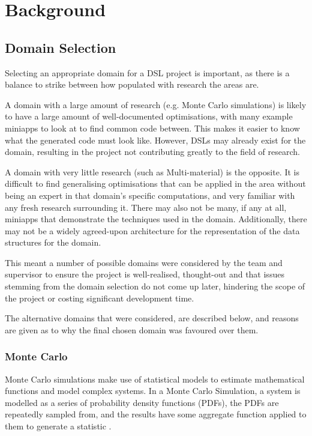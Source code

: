 \chapter{Background}

\section{Domain Selection}
Selecting an appropriate domain for a DSL project is important, as there is a balance to strike between how populated with research the areas are.

A domain with a large amount of research (e.g. Monte Carlo simulations) is likely to have a large amount of well-documented optimisations, with many example miniapps to look at to find common code between. This makes it easier to know what the generated code must look like. However, DSLs may already exist for the domain, resulting in the project not contributing greatly to the field of research.

A domain with very little research (such as Multi-material) is the opposite. It is difficult to find generalising optimisations that can be applied in the area without being an expert in that domain's specific computations, and very familiar with any fresh research surrounding it. There may also not be many, if any at all, miniapps that demonstrate the techniques used in the domain. Additionally, there may not be a widely agreed-upon architecture for the representation of the data structures for the domain.

This meant a number of possible domains were considered by the team and supervisor to ensure the project is well-realised, thought-out and that issues stemming from the domain selection do not come up later, hindering the scope of the project or costing significant development time.

The alternative domains that were considered, are described below, and reasons are given as to why the final chosen domain was favoured over them.


\subsection{Monte Carlo}\label{sec-montecarlo}
Monte Carlo simulations make use of statistical models to estimate mathematical functions and model complex systems. In a Monte Carlo Simulation, a system is modelled as a series of probability density functions (PDFs), the PDFs are repeatedly sampled from, and the results have some aggregate function applied to them to generate a statistic \cite{harrison2010introduction}.

